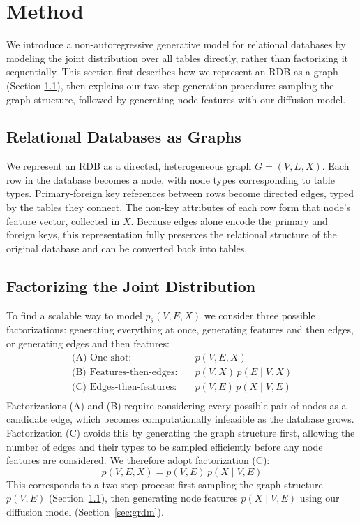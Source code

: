 \documentclass[manuscript,review]{acmart}
\begin{document}
\section{Method}
We introduce a non-autoregressive generative model for relational databases by modeling the joint distribution over all tables directly, rather than factorizing it sequentially. This section first describes how we represent an RDB as a graph (Section \ref{sec:graph-rep}), then explains our two-step generation procedure: sampling the graph structure, followed by generating node features with our diffusion model.

\subsection{Relational Databases as Graphs}
\label{sec:graph-rep}
We represent an RDB as a directed, heterogeneous graph $G = (V, E, X)$. Each row in the database becomes a node, with node types corresponding to table types. Primary-foreign key references between rows become directed edges, typed by the tables they connect. The non-key attributes of each row form that node's feature vector, collected in $X$. Because edges alone encode the primary and foreign keys, this representation fully preserves the relational structure of the original database and can be converted back into tables.

\subsection{Factorizing the Joint Distribution}
To find a scalable way to model $p_\theta(V,E,X)$ we consider three possible factorizations: generating everything at once, generating features and then edges, or generating edges and then features:
\begin{align}
    \text{(A) One-shot:} \quad & p(V,E,X) \\
    \text{(B) Features-then-edges:} \quad & p(V,X)\, p(E \mid V, X) \\
     \text{(C) Edges-then-features:} \quad & p(V, E)\, p(X \mid V, E) \\
\end{align}
Factorizations (A) and (B) require considering every possible pair of nodes as a candidate edge, which becomes computationally infeasible as the database grows. Factorization (C) avoids this by generating the graph structure first, allowing the number of edges and their types to be sampled efficiently before any node features are considered. We therefore adopt factorization (C):
\begin{equation}
    p(V,E,X) = p(V,E)\, p(X \mid V,E)
    \label{eq:factorization}
\end{equation}
This corresponds to a two step process: first sampling the graph structure $p(V,E)$ (Section~\ref{sec:graph-rep}), then generating node features $p(X \mid V,E)$ using our diffusion model (Section~\ref{sec:grdm}).
\end{document}
